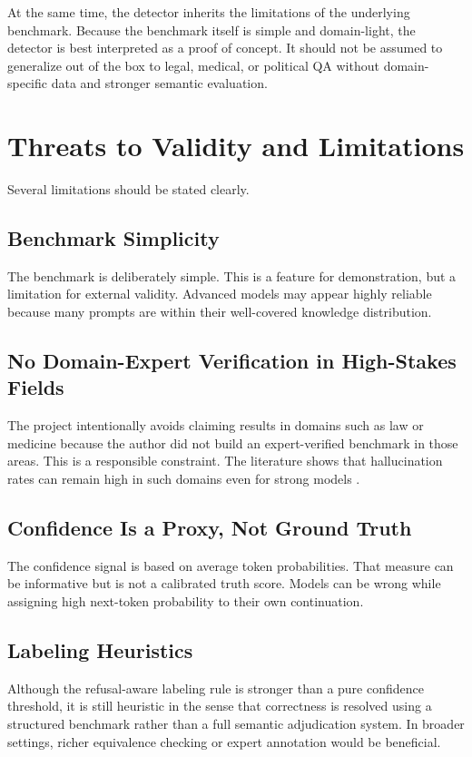 \documentclass[11pt]{article}
\begin{document}
At the same time, the detector inherits the limitations of the underlying benchmark. Because the benchmark itself is simple and domain-light, the detector is best interpreted as a proof of concept. It should not be assumed to generalize out of the box to legal, medical, or political QA without domain-specific data and stronger semantic evaluation.

\section{Threats to Validity and Limitations}
Several limitations should be stated clearly.

\subsection{Benchmark Simplicity}
The benchmark is deliberately simple. This is a feature for demonstration, but a limitation for external validity. Advanced models may appear highly reliable because many prompts are within their well-covered knowledge distribution.

\subsection{No Domain-Expert Verification in High-Stakes Fields}
The project intentionally avoids claiming results in domains such as law or medicine because the author did not build an expert-verified benchmark in those areas. This is a responsible constraint. The literature shows that hallucination rates can remain high in such domains even for strong models \cite{dahl2024legal, pal2023medhalt, pandit2025medhallu}.

\subsection{Confidence Is a Proxy, Not Ground Truth}
The confidence signal is based on average token probabilities. That measure can be informative but is not a calibrated truth score. Models can be wrong while assigning high next-token probability to their own continuation.

\subsection{Labeling Heuristics}
Although the refusal-aware labeling rule is stronger than a pure confidence threshold, it is still heuristic in the sense that correctness is resolved using a structured benchmark rather than a full semantic adjudication system. In broader settings, richer equivalence checking or expert annotation would be beneficial.
\end{document}
